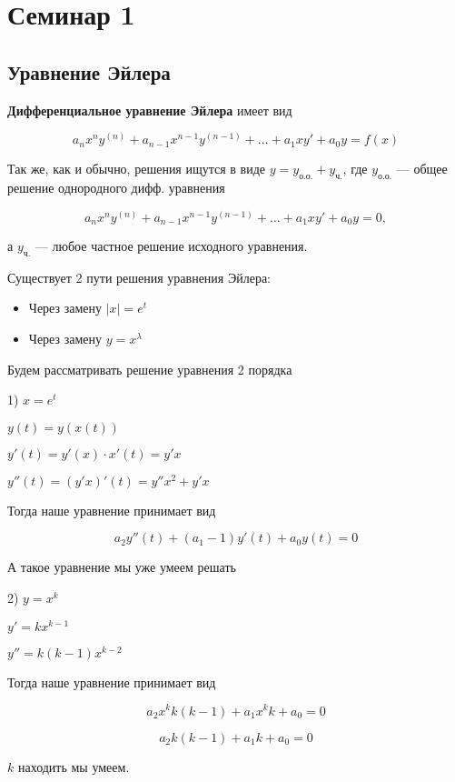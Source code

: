 \newpage

\section{Семинар 1}

\def \ycom {y_{\text{о.о.}}}
\def \ysp {y_{\text{ч.}}}

\subsection{Уравнение Эйлера}

\textbf{Дифференциальное уравнение Эйлера} имеет вид

$$a_n x^n y^{(n)} + a_{n-1} x^{n-1} y^{(n-1)} + \dots + a_1 x y' + a_0 y = f(x)$$

Так же, как и обычно, решения ищутся в виде $y = \ycom + \ysp$, где $\ycom$ --- общее решение однородного дифф. уравнения

$$a_n x^n y^{(n)} + a_{n-1} x^{n-1} y^{(n-1)} + \dots + a_1 x y' + a_0 y = 0,$$

а $\ysp$ --- любое частное решение исходного уравнения.

Существует 2 пути решения уравнения Эйлера:

\begin{itemize}
  \item Через замену $|x| = e^t$
  \item Через замену $y = x^\lambda$
\end{itemize}

Будем рассматривать решение уравнения 2 порядка

1) $x = e^t$

$y(t) = y(x(t))$

$y'(t) = y'(x) \cdot x'(t) = y'x$

$y''(t) = (y'x)'(t) = y''x^2 + y'x$

Тогда наше уравнение принимает вид

$$ a_2 y''(t) + (a_1 - 1)y'(t) + a_0 y(t) = 0$$

А такое уравнение мы уже умеем решать

2) $y = x^k$

$y' = kx^{k-1}$

$y'' = k(k-1)x^{k-2}$

Тогда наше уравнение принимает вид

$$ a_2 x^k k(k-1) + a_1x^k k + a_0 = 0$$

$$a_2k(k-1) + a_1k + a_0 = 0$$

$k$ находить мы умеем.


